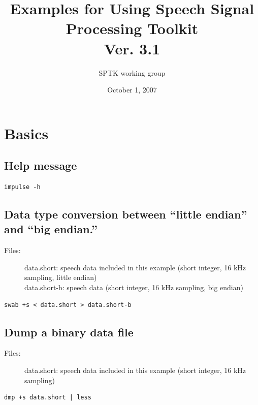 \documentclass[a4paper,10pt]{article}
\title{
  Examples for Using Speech Signal Processing Toolkit\\
  Ver. 3.1}
\author{SPTK working group}
\date{October 1, 2007}
\begin{document}
\maketitle

\tableofcontents

\newpage

\section{Basics}

\subsection{Help message}

\begin{verbatim}
impulse -h
\end{verbatim}

\subsection{Data type conversion between ``little endian'' and ``big endian.''}

\begin{description}
\item[Files:]
  data.short: speech data included in this example (short integer, 16 kHz sampling, little endian)\\
  data.short-b: speech data (short integer, 16 kHz sampling, big endian)
\end{description}
 
\begin{verbatim}
swab +s < data.short > data.short-b
\end{verbatim}

\subsection{Dump a binary data file}

\begin{description}
\item[Files:]
  data.short: speech data included in this example (short integer, 16 kHz sampling)
\end{description}

\begin{verbatim}
dmp +s data.short | less
\end{verbatim}
\end{document}
